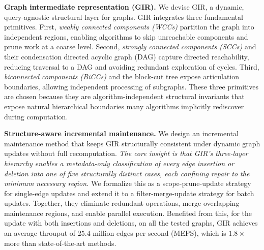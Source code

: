 \textbf{Graph intermediate representation (GIR).}
We devise GIR, a dynamic, query-agnostic structural layer for graphs. GIR integrates three fundamental primitives. First, \emph{weakly connected components (WCCs)} partition the graph into independent regions, enabling algorithms to skip unreachable components and prune work at a coarse level. Second, \emph{strongly connected components (SCCs)} and their condensation directed acyclic graph (DAG) capture directed reachability, reducing traversal to a DAG and avoiding redundant exploration of cycles. Third, \emph{biconnected components (BiCCs)} and the block-cut tree expose articulation boundaries, allowing independent processing of subgraphs. 
These three primitives are chosen because they are algorithm-independent structural invariants that expose natural hierarchical boundaries many algorithms implicitly rediscover during computation.

\textbf{Structure-aware incremental maintenance.} We design an incremental maintenance method that keeps GIR structurally consistent under dynamic graph updates without full recomputation. 
\textit{The core insight is that GIR's three-layer hierarchy enables a metadata-only classification of every edge insertion or deletion into one of five structurally distinct cases, each confining repair to the minimum necessary region.}
We formalize this as a scope-prune-update strategy for single-edge updates and extend it to a filter-merge-update strategy for batch updates. 
Together, they eliminate redundant operations, merge overlapping maintenance regions, and enable parallel execution.
Benefited from this, for the update with both insertions and deletions, on all the tested graphs, GIR achieves an average throuput of $25.4$ million edges per second (MEPS), which is $1.8\times$ more than state-of-the-art methods.


